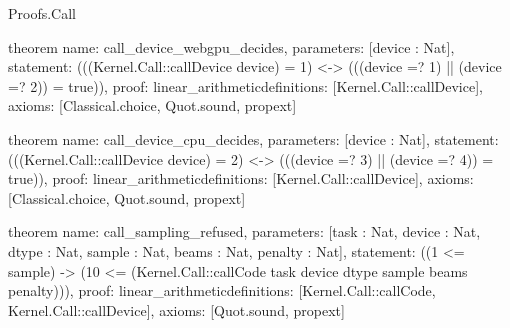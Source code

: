 \begin{lexlean}{Proofs.Call}
\begin{semanticmodule}
theorem{
  name: call_device_webgpu_decides,
  parameters: [device : Nat],
  statement: (((Kernel.Call::callDevice device) = 1) <-> (((device =? 1) || (device =? 2)) = true)),
  proof: linear_arithmetic{definitions: [Kernel.Call::callDevice]},
  axioms: [Classical.choice, Quot.sound, propext]
}

theorem{
  name: call_device_cpu_decides,
  parameters: [device : Nat],
  statement: (((Kernel.Call::callDevice device) = 2) <-> (((device =? 3) || (device =? 4)) = true)),
  proof: linear_arithmetic{definitions: [Kernel.Call::callDevice]},
  axioms: [Classical.choice, Quot.sound, propext]
}

theorem{
  name: call_sampling_refused,
  parameters: [task : Nat, device : Nat, dtype : Nat, sample : Nat, beams : Nat, penalty : Nat],
  statement: ((1 <= sample) -> (10 <= (Kernel.Call::callCode task device dtype sample beams penalty))),
  proof: linear_arithmetic{definitions: [Kernel.Call::callCode, Kernel.Call::callDevice]},
  axioms: [Quot.sound, propext]
}
\end{semanticmodule}
\end{lexlean}
